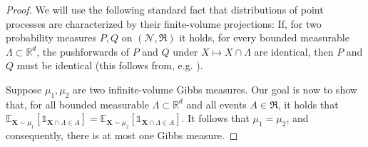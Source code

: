 \documentclass[10pt]{amsart}
\theoremstyle{definition}
\theoremstyle{remark}
\newcommand{\pointsets}{\mathcal{N}}
\newcommand{\events}{\mathfrak{R}}
\newcommand{\ind}[1]{\mathds{1}_{#1}}
\newcommand{\bX}{\mathbf{X}}
\newcommand{\E}{\mathbb{E}}
\newcommand{\R}{\mathbb{R}}
\newcommand{\region}{\Lambda}
\begin{document}
	\begin{proof}
		We will use the following standard fact that distributions of point processes are characterized by their finite-volume projections: 
		If, for two probability measures $P, Q$ on $(\pointsets, \events)$ it holds, for every bounded measurable $\region \subset \R^d$, the pushforwards of $P$ and $Q$ under $X \mapsto X \cap \region$ are identical, then $P$ and $Q$ must be identical (this follows from, e.g. \cite[Lemma~6.1.III]{daley2003introduction}).
		
		
		Suppose $\mu_1, \mu_2$ are two infinite-volume Gibbs measures. 
		Our goal is now to show that, for all bounded measurable $\region \subset \R^d$ and all events $A \in \events$, it holds that $\E_{\bX \sim \mu_1}[\ind{\bX \cap \region \in A}] = \E_{\bX \sim \mu_2}[\ind{\bX \cap \region \in A}]$. 
		It follows that $\mu_1 = \mu_2$, and consequently, there is at most one Gibbs measure.
		

\end{proof}
\end{document}
